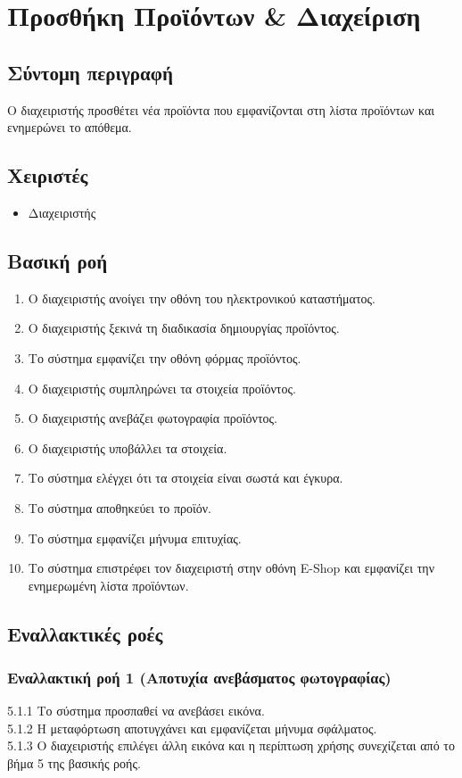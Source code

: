\documentclass[12pt,a4paper,twoside]{book}
\begin{document}
\section{Προσθήκη Προϊόντων \& Διαχείριση}

\subsection{Σύντομη περιγραφή}
Ο διαχειριστής προσθέτει νέα προϊόντα που εμφανίζονται στη λίστα προϊόντων και ενημερώνει το απόθεμα.

\subsection{Χειριστές}
\begin{itemize}
    \item Διαχειριστής
\end{itemize}

\subsection{Βασική ροή}
\begin{enumerate}
    \item Ο διαχειριστής ανοίγει την οθόνη του ηλεκτρονικού καταστήματος. 
    \item Ο διαχειριστής ξεκινά τη διαδικασία δημιουργίας προϊόντος. 
    \item Το σύστημα εμφανίζει την οθόνη φόρμας προϊόντος. 
    \item Ο διαχειριστής συμπληρώνει τα στοιχεία προϊόντος. 
    \item Ο διαχειριστής ανεβάζει φωτογραφία προϊόντος. 
    \item Ο διαχειριστής υποβάλλει τα στοιχεία. 
    \item Το σύστημα ελέγχει ότι τα στοιχεία είναι σωστά και έγκυρα. 
    \item Το σύστημα αποθηκεύει το προϊόν. 
    \item Το σύστημα εμφανίζει μήνυμα επιτυχίας. 
    \item Το σύστημα επιστρέφει τον διαχειριστή στην οθόνη E-Shop και εμφανίζει την ενημερωμένη λίστα προϊόντων.
\end{enumerate}

\subsection{Εναλλακτικές ροές}

\subsubsection*{Εναλλακτική ροή 1 (Αποτυχία ανεβάσματος φωτογραφίας)}
5.1.1 Το σύστημα προσπαθεί να ανεβάσει εικόνα.\\
\hspace*{\parindent}5.1.2 Η μεταφόρτωση αποτυγχάνει και εμφανίζεται μήνυμα σφάλματος.\\
\hspace*{\parindent}5.1.3 Ο διαχειριστής επιλέγει άλλη εικόνα και η περίπτωση χρήσης συνεχίζεται από το βήμα 5 της βασικής ροής.
\end{document}
